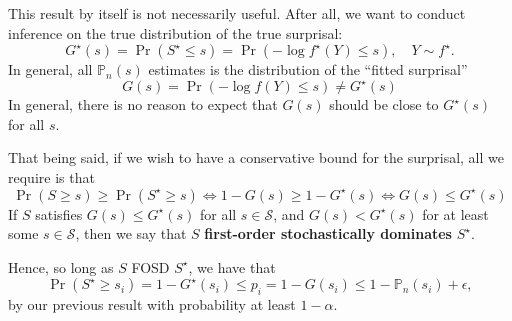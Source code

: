 \documentclass[a4paper,11pt]{article}
\begin{document}
This result by itself is not necessarily useful. After all, we want to conduct inference on the true distribution of the true surprisal: 
$$
G^\star(s)=\Pr(S^\star\le s)=\Pr(-\log f^\star(Y)\le s),\quad Y\sim f^\star.
$$In general, all $\mathbb{P}_n(s)$ estimates is the distribution of the ``fitted surprisal'' 
$$
G(s)=\Pr(-\log f(Y)\le s)\ne G^\star(s)
$$
In general, there is no reason to expect that $G(s)$ should be close to $G^\star(s)$ for all $s$. 

That being said, if we wish to have a conservative bound for the surprisal, all we require is that 
$$
\Pr(S\ge s)\ge \Pr(S^\star\ge s)\iff 1-G(s)\ge 1-G^\star(s)\iff G(s)\le G^\star(s)
$$
If $S$ satisfies $G(s)\le G^\star(s)$ for all $s\in\mathcal{S}$, and $G(s)< G^\star(s)$ for at least some $s\in\mathcal{S}$, then we say that $S$ \textbf{first-order stochastically dominates} $S^\star$. 

Hence, so long as $S$ FOSD $S^\star$, we have that 
$$
\Pr(S^\star\ge s_i)=1-G^\star(s_i)\le p_i=1-G(s_i)\le 1-\mathbb{P}_n(s_i)+\epsilon,
$$by our previous result with probability at least $1-\alpha$. 

 



\end{document}
